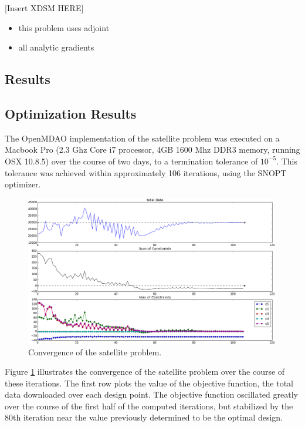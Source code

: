 \documentclass[]{aiaa-tc} %
\begin{document}
        [Insert XDSM HERE]

        \begin{itemize}
            \item this problem uses adjoint
            \item all analytic gradients
        \end{itemize}


    \subsection{Results}

        \subsection{Optimization Results}

        The OpenMDAO implementation of the satellite problem was executed on a
        Macbook Pro (2.3 Ghz Core i7 processor, 4GB 1600 Mhz DDR3 memory, running OSX 10.8.5)
        over the course of two days, to a termination tolerance of $10^{-5}$. This tolerance
        was achieved within approximately 106 iterations, using the SNOPT\cite{gill2005snopt}
        optimizer.

        \begin{figure}
        \centering
        \includegraphics[width=0.99\textwidth]{images/opt}
        \caption[width=0.22\textwidth]{Convergence of the satellite problem.
        \label{convergence}
        }
        \end{figure}


        Figure \ref{convergence} illustrates the convergence of the satellite problem over the course of
        these iterations. The first row plots the
        value of the objective function, the total data downloaded over each design point. The objective
        function oscillated greatly over the course of the first half of the computed iterations, but
        stabilized by the 80th iteration near the value previously determined \cite{CADRE2012}
        to be the optimal design.
\end{document}
